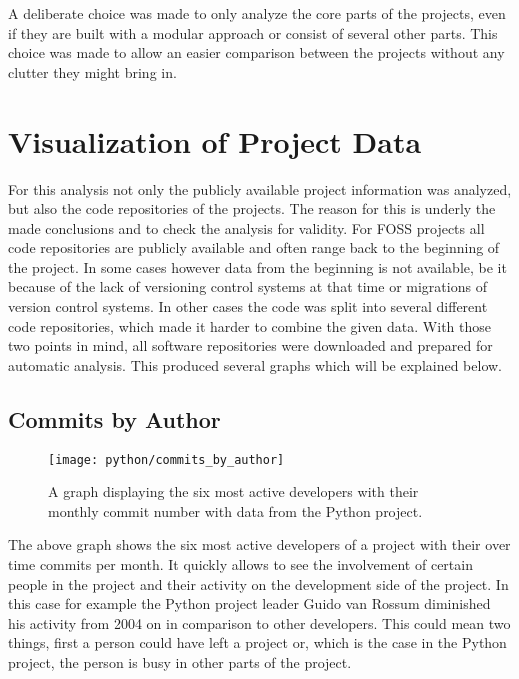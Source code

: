 A deliberate choice was made to only analyze the core parts of the projects,
even if they are built with a modular approach or consist of several other
parts. This choice was made to allow an easier comparison between the projects
without any clutter they might bring in.


\section{Visualization of Project Data} %

For this analysis not only the publicly available project information was
analyzed, but also the code repositories of the projects. The reason for this
is underly the made conclusions and to check the analysis for validity. For
\ac{FOSS} projects all code repositories are publicly available and often range
back to the beginning of the project. In some cases however data from the
beginning is not available, be it because of the lack of versioning control
systems at that time or migrations of version control systems. In other cases
the code was split into several different code repositories, which made it
harder to combine the given data. With those two points in mind, all software
repositories were downloaded and prepared for automatic analysis. This produced
several graphs which will be explained below.

\subsection{Commits by Author} %

\begin{figure}[h!t]
  \centering
  \texttt{[image: python/commits\_by\_author]}
  \caption[The Commits by Author Graph]
  {A graph displaying the six most active developers with their monthly commit
    number with data from the Python project.}
\end{figure}

The above graph shows the six most active developers of a project with their
over time commits per month. It quickly allows to see the involvement of
certain people in the project and their activity on the development side of the
project. In this case for example the Python project leader Guido van Rossum
diminished his activity from 2004 on in comparison to other developers. This
could mean two things, first a person could have left a project or, which is
the case in the Python project, the person is busy in other parts of the
project.

